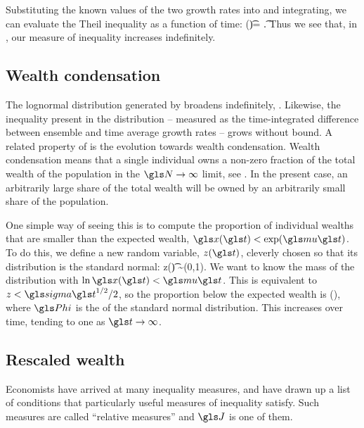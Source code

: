 Substituting the known values of the two growth rates into  and integrating, we can evaluate the Theil inequality as a function of time:
\be
\J(\t)= \t.
\ee
Thus we see that, in \GBM, our measure of inequality increases indefinitely.


\subsection{Wealth condensation}
The lognormal distribution generated by \GBM broadens indefinitely, . Likewise, the inequality present in the distribution -- measured as the time-integrated difference between ensemble and time average growth rates -- grows without bound. A related property of \GBM is the evolution towards wealth condensation. Wealth condensation means that a single individual owns a non-zero fraction of the total wealth of the population in the $\N\to\infty$ limit, see \eg \cite{BouchaudMezard2000}. In the present case, an arbitrarily large share of the  total wealth will be owned by an arbitrarily small share of the population.

One simple way of seeing this is to compute the proportion of individual wealths that are smaller than the expected wealth, \ie $\x(\t)<\exp(\gmu \t)$. To do this, we define a new random variable, $z(\t)$,  cleverly chosen so that its distribution is the standard normal:
\be
z(\t) \equiv {} \sim \mathcal{\N}(0,1).
\ee
We want to know the mass of the distribution with $\ln \x(\t)<\gmu \t$. This is equivalent to $z<\gsigma \t^{1/2}/2$, so the proportion below the expected wealth is
\be
\gPhi\left(\right),
\ee
where $\gPhi$ is the \CDF of the standard normal distribution. This increases over time, tending to one as $\t\to\infty$.


\subsection{Rescaled wealth}
Economists have arrived at many inequality measures, and have drawn up a list of conditions that particularly useful measures of inequality satisfy. Such measures are called ``relative measures'' \cite[Appendix 4]{Sen1997} and $\J$ is one of them.

